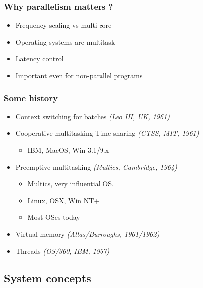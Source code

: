\begin{frame}
  \frametitle{Why parallelism matters ?}
  \begin{itemize}
  \item Frequency scaling vs multi-core
  \item Operating systems are multitask
  \item Latency control
  \item Important even for non-parallel programs
  \end{itemize}
\end{frame}


\begin{frame}
  \frametitle{Some history}

  \begin{itemize}
  \item Context switching for batches \emph{(Leo III, UK, 1961)}
  \item Cooperative multitasking Time-sharing \emph{(CTSS, MIT, 1961)}
    \begin{itemize}
    \item IBM, MacOS, Win 3.1/9.x
    \end{itemize}
  \item Preemptive multitasking \emph{(Multics, Cambridge, 1964)}
    \begin{itemize}
    \item Multics, very influential OS.
    \item Linux, OSX, Win NT+
    \item Most OSes today
    \end{itemize}
  \item Virtual memory \emph{(Atlas/Burroughs, 1961/1962)}
  \item Threads \emph{(OS/360, IBM, 1967)}
  \end{itemize}
\end{frame}



\subsection{System concepts}
\label{subsec:sysbase}


